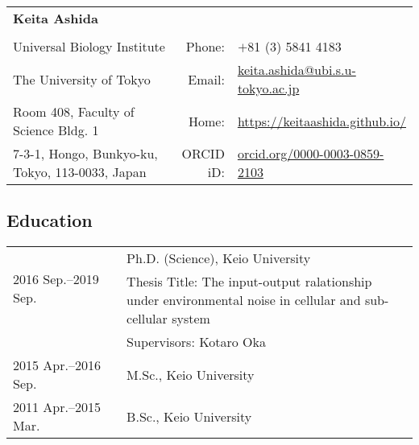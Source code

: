 \documentclass[12pt,]{scrartcl}
\date{}
\begin{document}
\begin{table}[h]
{\def\arraystretch{1.2}\tabcolsep=0pt
\begin{tabular}{p{0.60\linewidth}p{0.05\linewidth}p{0.35\linewidth}}

  \multirow{1}{*}{\LARGE \textbf{Keita Ashida}} &  &  \\
  
  & & \\
  
    Universal Biology Institute & \multicolumn{1}{r}{Phone:\;\;} & \multicolumn{1}{l}{$+$81 (3) 5841 4183}\\
  
  The University of Tokyo & \multicolumn{1}{r}{Email:\;\;} &\multicolumn{1}{l}{\href{keita.ashida@ubi.s.u-tokyo.ac.jp}{keita.ashida@ubi.s.u-tokyo.ac.jp}} \\
  
  Room 408, Faculty of Science Bldg. 1 & \multicolumn{1}{r}{Home:\;\;} & \multicolumn{1}{l}{\url{https://keitaashida.github.io/}} \\
  
  7-3-1, Hongo, Bunkyo-ku, Tokyo, 113-0033, Japan & \multicolumn{1}{r}{ORCID iD:\;\;} & \multicolumn{1}{l}{\href{https://orcid.org/0000-0003-0859-2103}{orcid.org/0000-0003-0859-2103}}\\
\end{tabular}
}
\end{table}

\subsection{Education}\label{education}

\begin{table}[h]
{\def\arraystretch{1.5}\tabcolsep=0pt
\begin{tabular}{p{0.28\linewidth}p{0.75\linewidth}}
    \multirow{2}{*}[0.85em]{2016 Sep.--2019 Sep.} & Ph.D. (Science), Keio University\\
  & Thesis Title: The input-output ralationship under environmental noise in cellular and sub-cellular system\\
  & Supervisors: Kotaro Oka\\
  
  2015 Apr.--2016 Sep. & M.Sc., Keio University\\

  2011 Apr.--2015 Mar. & B.Sc., Keio University\\

\end{tabular}
}
\end{table}
\end{document}
